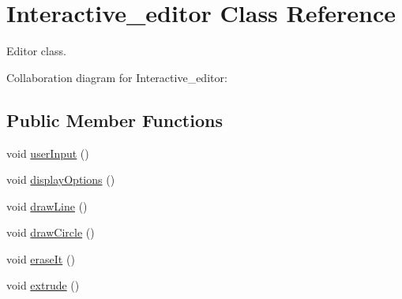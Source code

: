 \hypertarget{classInteractive__editor}{}\section{Interactive\+\_\+editor Class Reference}
\label{classInteractive__editor}


Editor class.  




Collaboration diagram for Interactive\+\_\+editor\+:
\subsection*{Public Member Functions}
\begin{DoxyCompactItemize}
\item 
void \hyperlink{classInteractive__editor_aa7d472e169eed213d1fcb874c6f5a6cd}{user\+Input} ()
\item 
void \hyperlink{classInteractive__editor_a8078ec1404bdd80e09320d14d198f628}{display\+Options} ()
\item 
void \hyperlink{classInteractive__editor_a30310b574f37f50f7d40e2acebf93723}{draw\+Line} ()
\item 
void \hyperlink{classInteractive__editor_a630465bba8474cf03efb3e0716009e1f}{draw\+Circle} ()
\item 
void \hyperlink{classInteractive__editor_a29bd8d4ac9bff675360a661ab9f04db4}{erase\+It} ()
\item 
void \hyperlink{classInteractive__editor_a6543fe863fa4a902fb4dd71cf6318533}{extrude} ()
\end{DoxyCompactItemize}
